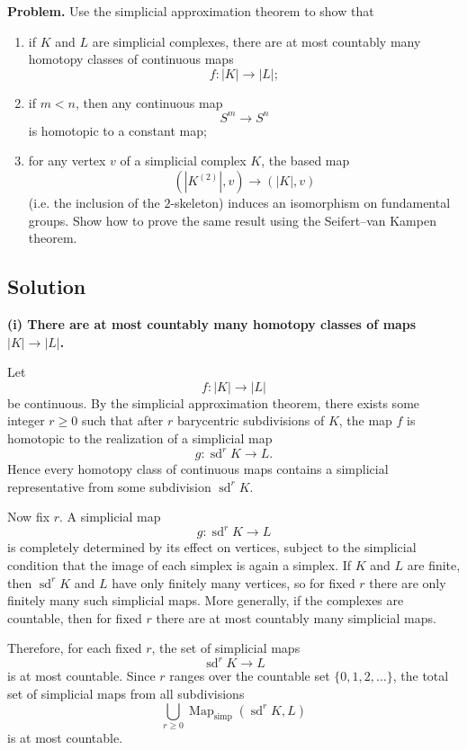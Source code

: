 \documentclass[12pt,a4paper]{article}
\theoremstyle{notespace}
\begin{document}
\textbf{Problem.}
Use the simplicial approximation theorem to show that

\begin{enumerate}
	\item[(i)] if \(K\) and \(L\) are simplicial complexes, there are at most countably many homotopy classes of continuous maps
	\[
	f:|K|\to |L|;
	\]
	
	\item[(ii)] if \(m<n\), then any continuous map
	\[
	S^m\to S^n
	\]
	is homotopic to a constant map;
	
	\item[(iii)] for any vertex \(v\) of a simplicial complex \(K\), the based map
	\[
	(|K^{(2)}|,v)\to (|K|,v)
	\]
	(i.e. the inclusion of the \(2\)-skeleton) induces an isomorphism on fundamental groups. Show how to prove the same result using the Seifert--van Kampen theorem.
\end{enumerate}

\subsection{Solution}

\textbf{(i) There are at most countably many homotopy classes of maps \( |K|\to |L| \).}

Let
\[
f:|K|\to |L|
\]
be continuous. By the simplicial approximation theorem, there exists some integer \(r\ge 0\) such that after \(r\) barycentric subdivisions of \(K\), the map \(f\) is homotopic to the realization of a simplicial map
\[
g:\operatorname{sd}^r K \to L.
\]
Hence every homotopy class of continuous maps contains a simplicial representative from some subdivision \(\operatorname{sd}^r K\).

Now fix \(r\). A simplicial map
\[
g:\operatorname{sd}^r K \to L
\]
is completely determined by its effect on vertices, subject to the simplicial condition that the image of each simplex is again a simplex. If \(K\) and \(L\) are finite, then \(\operatorname{sd}^r K\) and \(L\) have only finitely many vertices, so for fixed \(r\) there are only finitely many such simplicial maps. More generally, if the complexes are countable, then for fixed \(r\) there are at most countably many simplicial maps.

Therefore, for each fixed \(r\), the set of simplicial maps
\[
\operatorname{sd}^r K \to L
\]
is at most countable. Since \(r\) ranges over the countable set \(\{0,1,2,\dots\}\), the total set of simplicial maps from all subdivisions
\[
\bigcup_{r\ge 0}\operatorname{Map}_{\mathrm{simp}}(\operatorname{sd}^r K,L)
\]
is at most countable.
\end{document}
